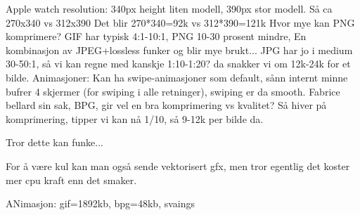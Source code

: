 Apple watch resolution: 340px height liten modell, 390px stor modell.
Så ca 270x340 vs 312x390
Det blir 270*340=92k vs 312*390=121k
Hvor mye kan PNG komprimere? GIF har typisk 4:1-10:1, PNG 10-30 prosent mindre,
En kombinasjon av JPEG+lossless funker og blir mye brukt... JPG har jo i medium
30-50:1, så vi kan regne med kanskje 1:10-1:20? da snakker vi om 12k-24k for et
bilde. Animasjoner: Kan ha swipe-animasjoner som default, sånn internt minne
bufrer 4 skjermer (for swiping i alle retninger), swiping er da smooth.
Fabrice bellard sin sak, BPG, gir vel en bra komprimering vs kvalitet?
Så hiver på komprimering, tipper vi kan nå 1/10, så 9-12k per bilde da.

Tror dette kan funke...

For å være kul kan man også sende vektorisert gfx, men tror egentlig det
koster mer cpu kraft enn det smaker.

ANimasjon: gif=1892kb, bpg=48kb, svaings
